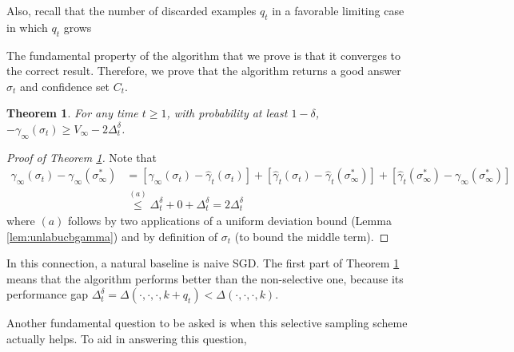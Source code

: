\documentclass{colt2019} %
\newtheorem{thm}{Theorem}%
\newtheorem{lem}[thm]{Lemma}
\newcommand{\gamhat}{\hat{\gamma}}
\newcommand{\cO}{\mathcal{O}}
\newcommand{\lrb}[1]{\left[#1\right]}
\begin{document}
Also, recall that the number of discarded examples $q_t$ in a favorable limiting case in which $q_t$ grows

The fundamental property of the algorithm that we prove is that it converges to the correct result. 
Therefore, we prove that the algorithm returns a good answer $\sigma_t$ and confidence set $C_t$.  
\begin{thm}
\label{thm:algcorrect}
For any time $t \geq 1$, 
with probability at least $1-\delta$, $- \gamma_\infty (\sigma_t) \geq V_\infty - 2 \Delta_t^{\delta}$.
\end{thm}
\begin{proof}[Proof of Theorem \ref{thm:algcorrect}]
Note that 
\begin{align*}
\gamma_\infty (\sigma_t) - \gamma_\infty (\sigma_{\infty}^*) 
&= \lrb{ \gamma_\infty (\sigma_t) - \gamhat_t (\sigma_t) } 
+ \lrb{ \gamhat_t (\sigma_t) - \gamhat_t (\sigma_{\infty}^*) }
+ \lrb{ \gamhat_t (\sigma_{\infty}^*) - \gamma_\infty (\sigma_{\infty}^*) } \\
&\stackrel{(a)}{\leq } \Delta_t^{\delta} + 0 + \Delta_t^{\delta} = 2 \Delta_t^{\delta}
\end{align*}
where $(a)$ follows by two applications of a uniform deviation bound (Lemma \ref{lem:unlabucbgamma}) 
and by definition of $\sigma_t$ (to bound the middle term). 
\end{proof}

In this connection, a natural baseline is naive SGD. 
The first part of Theorem \ref{thm:algcorrect} means that the algorithm performs better than the non-selective one, 
because its performance gap $\Delta_t^{\delta} = \Delta (\cdot, \cdot, \cdot, k + q_t) < \Delta (\cdot, \cdot, \cdot, k)$.


Another fundamental question to be asked is when this selective sampling scheme actually helps. 
To aid in answering this question, 
\end{document}
